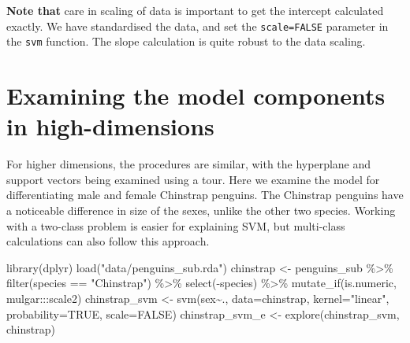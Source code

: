 \documentclass[
  letterpaper,
]{book}
\newenvironment{Shaded}{\begin{snugshade}}{\end{snugshade}}
\newcommand{\AttributeTok}[1]{\textcolor[rgb]{0.40,0.45,0.13}{#1}}
\newcommand{\ConstantTok}[1]{\textcolor[rgb]{0.56,0.35,0.01}{#1}}
\newcommand{\FunctionTok}[1]{\textcolor[rgb]{0.28,0.35,0.67}{#1}}
\newcommand{\NormalTok}[1]{\textcolor[rgb]{0.00,0.23,0.31}{#1}}
\newcommand{\OtherTok}[1]{\textcolor[rgb]{0.00,0.23,0.31}{#1}}
\newcommand{\SpecialCharTok}[1]{\textcolor[rgb]{0.37,0.37,0.37}{#1}}
\newcommand{\StringTok}[1]{\textcolor[rgb]{0.13,0.47,0.30}{#1}}
\begin{document}
\textbf{Note that} care in scaling of data is important to get the
intercept calculated exactly. We have standardised the data, and set the
\texttt{scale=FALSE} parameter in the \texttt{svm} function. The slope
calculation is quite robust to the data scaling.

\hypertarget{examining-the-model-components-in-high-dimensions}{%
\section{Examining the model components in
high-dimensions}\label{examining-the-model-components-in-high-dimensions}}

For higher dimensions, the procedures are similar, with the hyperplane
and support vectors being examined using a tour. Here we examine the
model for differentiating male and female Chinstrap penguins. The
Chinstrap penguins have a noticeable difference in size of the sexes,
unlike the other two species. Working with a two-class problem is easier
for explaining SVM, but multi-class calculations can also follow this
approach.

\begin{Shaded}
\begin{Highlighting}[]
\FunctionTok{library}\NormalTok{(dplyr)}
\FunctionTok{load}\NormalTok{(}\StringTok{"data/penguins\_sub.rda"}\NormalTok{)}
\NormalTok{chinstrap }\OtherTok{\textless{}{-}}\NormalTok{ penguins\_sub }\SpecialCharTok{\%\textgreater{}\%}
  \FunctionTok{filter}\NormalTok{(species }\SpecialCharTok{==} \StringTok{"Chinstrap"}\NormalTok{) }\SpecialCharTok{\%\textgreater{}\%}
  \FunctionTok{select}\NormalTok{(}\SpecialCharTok{{-}}\NormalTok{species) }\SpecialCharTok{\%\textgreater{}\%}
  \FunctionTok{mutate\_if}\NormalTok{(is.numeric, mulgar}\SpecialCharTok{:::}\NormalTok{scale2)}
\NormalTok{chinstrap\_svm }\OtherTok{\textless{}{-}} \FunctionTok{svm}\NormalTok{(sex}\SpecialCharTok{\textasciitilde{}}\NormalTok{., }\AttributeTok{data=}\NormalTok{chinstrap, }
                     \AttributeTok{kernel=}\StringTok{"linear"}\NormalTok{,}
                     \AttributeTok{probability=}\ConstantTok{TRUE}\NormalTok{, }
                     \AttributeTok{scale=}\ConstantTok{FALSE}\NormalTok{)}
\NormalTok{chinstrap\_svm\_e }\OtherTok{\textless{}{-}} \FunctionTok{explore}\NormalTok{(chinstrap\_svm, chinstrap)}
\end{Highlighting}
\end{Shaded}
\end{document}
